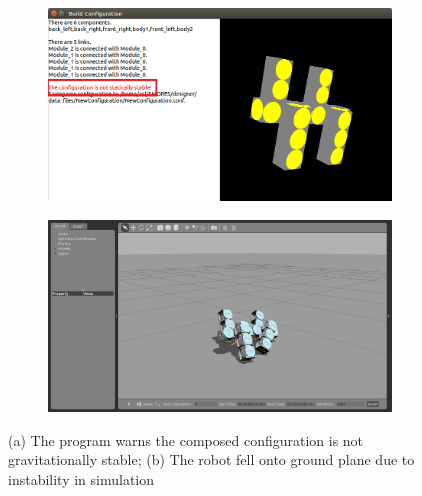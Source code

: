 \documentclass[conference]{IEEEtran}
\theoremstyle{definition}
\begin{document}
\begin{figure}
\begin{center}
        \begin{subfigure}[b]{0.48\columnwidth}
                \includegraphics[width=\textwidth]{images/designer_unstable.png}
                \caption{}
                \label{fig:designer_unstable}
           \end{subfigure}
        \begin{subfigure}[b]{0.48\columnwidth}
                \includegraphics[width=\textwidth]{images/gazebo_unstable2.png}
                \caption{}
                \label{fig:gazebo_unstable2}
        \end{subfigure}
\end{center}
\caption{(a) The program warns the composed configuration is not gravitationally stable; (b) The robot fell onto ground plane due to instability in simulation}
\label{fig:unstable}
\end{figure}
\end{document}
